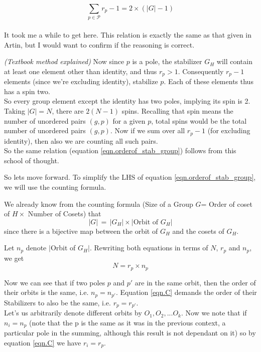 \documentclass[12pt]{article}
\begin{document}
\begin{equation}
\sum\limits_{p \in \mathcal{P}} {r_{p} - 1}= 2 \times ({|G|} - 1) 
\label{eqn.orderof_stab_group}
\end{equation}\\
It took me a while to get here. This relation is exactly the same as that given in Artin, but I would want to confirm if the reasoning is correct.
\par
\emph{(Textbook method explained)}
Now since $p$ is a pole, the stabilizer $G_{H}$ will contain at least one element other than identity, and thus $r_{p}>1$. Consequently $r_{p}-1$ elements (since we're excluding identity), stabilize $p$. Each of these elements thus has a spin two.\\
So every group element except the identity has two poles, implying its spin is 2. Taking $|G|=N$, there are $2(N-1)$ spins. Recalling that spin means the number of unordered pairs $(g,p)$ for a given $p$, total spins would be the total number of unordered pairs $(g,p)$. Now if we sum over all $r_{p} - 1$ (for excluding identity), then also we are counting all such pairs.\\
So the same relation (equation \ref{eqn.orderof_stab_group}) follows from this school of thought.\\
\par
So lets move forward. To simplify the LHS of equation \ref{eqn.orderof_stab_group}, we will use the counting formula.
\par
We already know from the counting formula (Size of a Group $G$= Order of coset of $H \times$ Number of Cosets) that
\begin{equation}
|G| \, = \, |G_{H}| \times | \text{Orbit of } G_{H}|
\label{eqn.B}
\end{equation}
since there is a bijective map between the orbit of $G_{H}$ and the cosets of $G_{H}$.
\par
Let $n_{p}$ denote $|$Orbit of $G_{H}|$. Rewriting both equations in terms of $N$, $r_{p}$ and $n_{p}$, we get\\
\begin{equation}
N=r_{p} \times n_{p}
\label{eqn.C}
\end{equation}
\par
Now we can see that if two poles $p$ and $p'$ are in the same orbit, then the order of their orbits is the same, i.e. $n_{p} =n_{p'}$. Equation \ref{eqn.C} demands the order of their Stabilizers to also be the same, i.e. $r_{p}=r_{p'}$.\\
Let's us arbitrarily denote different orbits by $O_{1}, O_{2}, ... O_{k}$. Now we note that if $n_{i}=n_{p}$ (note that the p is the same as it was in the previous context, a particular pole in the summing, although this result is not dependant on it) so by equation \ref{eqn.C} we have $r_{i}=r_{p}$.
\end{document}

